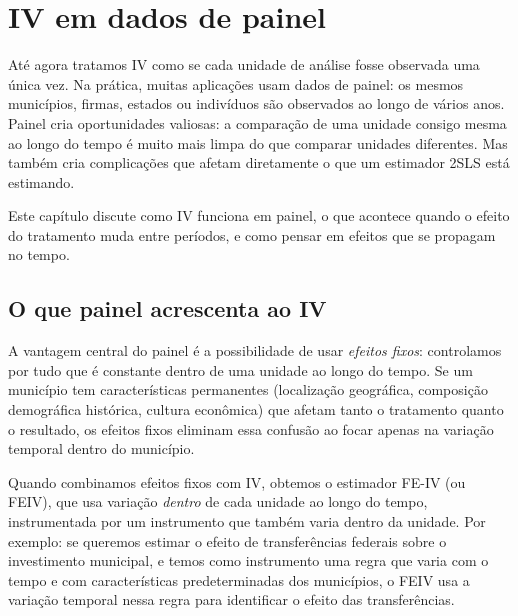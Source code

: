 
\chapter{IV em dados de painel}
\label{cap:iv_painel}

Até agora tratamos IV como se cada unidade de análise fosse observada uma única vez. Na prática, muitas aplicações usam dados de painel: os mesmos municípios, firmas, estados ou indivíduos são observados ao longo de vários anos. Painel cria oportunidades valiosas: a comparação de uma unidade consigo mesma ao longo do tempo é muito mais limpa do que comparar unidades diferentes. Mas também cria complicações que afetam diretamente o que um estimador 2SLS está estimando.

Este capítulo discute como IV funciona em painel, o que acontece quando o efeito do tratamento muda entre períodos, e como pensar em efeitos que se propagam no tempo.

\section{O que painel acrescenta ao IV}
\label{sec:painel_vantagens}

A vantagem central do painel é a possibilidade de usar \textit{efeitos fixos}: controlamos por tudo que é constante dentro de uma unidade ao longo do tempo. Se um município tem características permanentes (localização geográfica, composição demográfica histórica, cultura econômica) que afetam tanto o tratamento quanto o resultado, os efeitos fixos eliminam essa confusão ao focar apenas na variação temporal dentro do município.

Quando combinamos efeitos fixos com IV, obtemos o estimador FE-IV (ou FEIV), que usa variação \textit{dentro} de cada unidade ao longo do tempo, instrumentada por um instrumento que também varia dentro da unidade. Por exemplo: se queremos estimar o efeito de transferências federais sobre o investimento municipal, e temos como instrumento uma regra que varia com o tempo e com características predeterminadas dos municípios, o FEIV usa a variação temporal nessa regra para identificar o efeito das transferências.

